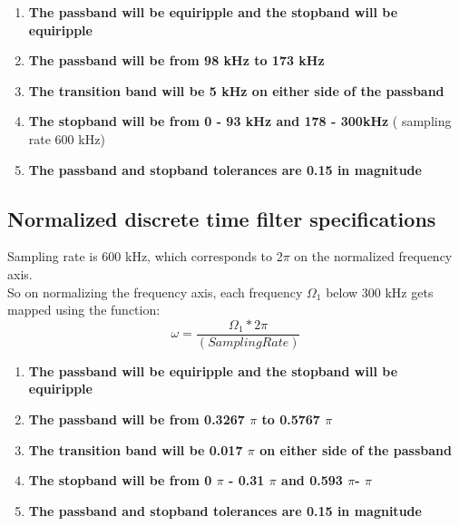 \documentclass[12pt]{article}
\begin{document}
    \begin{enumerate}
    \item \textbf{The passband will be equiripple and the stopband will be equiripple}
    \item \textbf{The passband will be from 98 kHz to 173 kHz}
    \item \textbf{The transition band will be 5 kHz on either side of the passband}
    \item \textbf{The stopband will be from 0 - 93 kHz and 178 - 300kHz} ( sampling rate 600 kHz)
    \item \textbf{The passband and stopband tolerances are 0.15 in magnitude}

\end{enumerate}
\subsection{Normalized discrete time filter specifications}
Sampling rate is 600 kHz, which corresponds to 2$\pi$ on the normalized frequency axis.
\\So on normalizing the frequency axis, each frequency $\Omega_1$ below 300 kHz gets mapped using the function:
\begin{equation}
    \omega=\frac{\Omega_1 * 2 \pi}{(Sampling Rate)}
\end{equation}
\begin{enumerate}
    \item \textbf{The passband will be equiripple and the stopband will be equiripple}
    \item \textbf{The passband will be from 0.3267 $\pi$ to 0.5767 $\pi$}
    \item \textbf{The transition band will be 0.017 $\pi$ on either side of the passband}
    \item \textbf{The stopband will be from 0 $\pi$ - 0.31 $\pi$ and 0.593 $\pi$- $\pi$}
    \item \textbf{The passband and stopband tolerances are 0.15 in magnitude}

\end{enumerate}
\newpage
\end{document}
